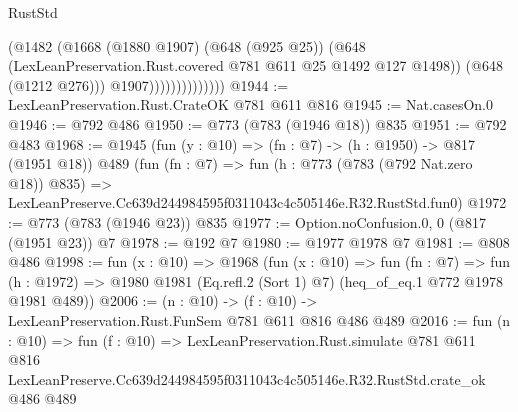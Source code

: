\begin{lexlean}{RustStd}
\begin{coremodule}
                              (@1482
                                (@1668
                                  (@1880 @1907)
                                  (@648 (@925 @25))
                                  (@648
                                    (LexLeanPreservation.Rust.covered
                                      @781
                                      @611
                                      @25
                                      @1492
                                      @127
                                      @1498))
                                  (@648 (@1212 @276)))
                                @1907))))))))))))))
@1944 := LexLeanPreservation.Rust.CrateOK @781 @611 @816
@1945 := Nat.casesOn.{0}
@1946 := @792 @486
@1950 := @773 (@783 (@1946 @18)) @835
@1951 := @792 @483
@1968 := @1945
    (fun (y : @10) => (fn : @7) -> (h : @1950) -> @817 (@1951 @18))
    @489
    (fun (fn : @7) =>
    fun (h : @773 (@783 (@792 Nat.zero @18)) @835) =>
    LexLeanPreserve.Cc639d244984595f0311043c4c505146e.R32.RustStd.fun0)
@1972 := @773 (@783 (@1946 @23)) @835
@1977 := Option.noConfusion.{0, 0} (@817 (@1951 @23)) @7
@1978 := @192 @7
@1980 := @1977 @1978 @7
@1981 := @808 @486
@1998 := fun (x : @10) =>
  @1968
    (fun (x : @10) =>
    fun (fn : @7) =>
    fun (h : @1972) => @1980 @1981 (Eq.refl.{2} (Sort 1) @7) (heq_of_eq.{1} @772 @1978 @1981 @489))
@2006 := (n : @10) -> (f : @10) -> LexLeanPreservation.Rust.FunSem @781 @611 @816 @486 @489
@2016 := fun (n : @10) =>
  fun (f : @10) =>
  LexLeanPreservation.Rust.simulate
    @781
    @611
    @816
    LexLeanPreserve.Cc639d244984595f0311043c4c505146e.R32.RustStd.crate_ok
    @486
    @489
\end{coremodule}
\end{lexlean}
